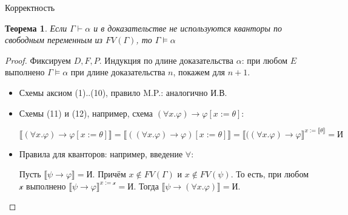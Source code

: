 \documentclass[aspectratio=169]{beamer}
\newtheorem{thm}{Теорема}[section]
\begin{document}
\begin{frame}{Корректность}
\begin{thm}Если $\Gamma \vdash \alpha$ и в доказательстве не используются кванторы по свободным переменным из $FV(\Gamma)$, то $\Gamma \models \alpha$\end{thm}
\begin{proof}Фиксируем $D, F, P$. Индукция по длине доказательства $\alpha$: при любом $E$ выполнено $\Gamma\models\alpha$ 
при длине доказательства $n$, покажем для $n+1$. 
\begin{itemize}
\item Схемы аксиом (1)..(10), правило M.P.: аналогично И.В.
\item Схемы (11) и (12), например, схема $(\forall x.\varphi) \rightarrow \varphi [x := \theta]$: \vspace{-0.6cm}

$$\llbracket (\forall x.\varphi) \rightarrow \varphi [x := \theta]\rrbracket = \llbracket ((\forall x.\varphi) \rightarrow \varphi) [x := \theta] \rrbracket =
  \llbracket ((\forall x.\varphi) \rightarrow \varphi \rrbracket ^ { x := \llbracket\theta\rrbracket } = \text{И}$$

\item Правила для кванторов: например, введение $\forall$:

  Пусть $\llbracket \psi \rightarrow \varphi \rrbracket = \text{И}$. Причём $x \notin FV(\Gamma)$ и $x \notin FV(\psi)$. То есть,
  при любом $\mathcal{x}$ выполнено $\llbracket \psi \rightarrow \varphi \rrbracket^{x := \mathcal{x}} = \text{И}$. Тогда
  $\llbracket \psi \rightarrow (\forall x.\varphi) \rrbracket = \text{И}$.

\end{itemize}
\end{proof}
\end{frame}
\end{document}
